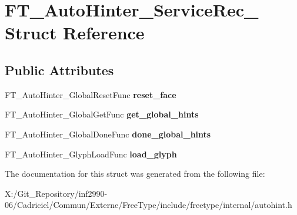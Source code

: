\hypertarget{struct_f_t___auto_hinter___service_rec__}{\section{F\-T\-\_\-\-Auto\-Hinter\-\_\-\-Service\-Rec\-\_\- Struct Reference}
\label{struct_f_t___auto_hinter___service_rec__}
}
\subsection*{Public Attributes}
\begin{DoxyCompactItemize}
\item 
\hypertarget{struct_f_t___auto_hinter___service_rec___a846234a9c9c5427d3274e4568f33272c}{F\-T\-\_\-\-Auto\-Hinter\-\_\-\-Global\-Reset\-Func {\bfseries reset\-\_\-face}}\label{struct_f_t___auto_hinter___service_rec___a846234a9c9c5427d3274e4568f33272c}

\item 
\hypertarget{struct_f_t___auto_hinter___service_rec___a958371c33e08125393cd4b401a22f2a0}{F\-T\-\_\-\-Auto\-Hinter\-\_\-\-Global\-Get\-Func {\bfseries get\-\_\-global\-\_\-hints}}\label{struct_f_t___auto_hinter___service_rec___a958371c33e08125393cd4b401a22f2a0}

\item 
\hypertarget{struct_f_t___auto_hinter___service_rec___a648ac943fc1194f60ba638e0a59486e9}{F\-T\-\_\-\-Auto\-Hinter\-\_\-\-Global\-Done\-Func {\bfseries done\-\_\-global\-\_\-hints}}\label{struct_f_t___auto_hinter___service_rec___a648ac943fc1194f60ba638e0a59486e9}

\item 
\hypertarget{struct_f_t___auto_hinter___service_rec___ad36efe39469959626744ebdd04a04031}{F\-T\-\_\-\-Auto\-Hinter\-\_\-\-Glyph\-Load\-Func {\bfseries load\-\_\-glyph}}\label{struct_f_t___auto_hinter___service_rec___ad36efe39469959626744ebdd04a04031}

\end{DoxyCompactItemize}


The documentation for this struct was generated from the following file\-:\begin{DoxyCompactItemize}
\item 
X\-:/\-Git\-\_\-\-Repository/inf2990-\/06/\-Cadriciel/\-Commun/\-Externe/\-Free\-Type/include/freetype/internal/autohint.\-h\end{DoxyCompactItemize}

